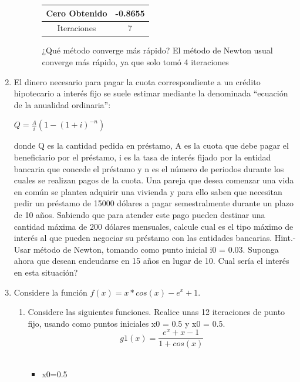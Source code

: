 \documentclass{udparticle}
\begin{document}
\begin{enumerate}
\begin{enumerate}
\begin{enumerate}
\begin{table}[H]
\begin{tabular} { |c|c|}
        \hline
        Cero Obtenido &  -0.8655\\
        \hline
        Iteraciones   &    7\\
        \hline
        
        \end{tabular}
        \end{table}
        ¿Qué método converge más rápido?
        El método de Newton usual converge más rápido, ya que solo tomó 4 iteraciones %
    \end{enumerate}
\end{enumerate}
\newpage
\item El dinero necesario para pagar la cuota correspondiente a un crédito hipotecario a interés fijo se suele
estimar mediante la denominada “ecuación de la anualidad ordinaria”:
\begin{center}
    $ Q = \frac{A}{i}(1-(1+i)^{-n}) $
\end{center}
donde Q es la cantidad pedida en préstamo, A es la cuota que debe pagar el beneficiario por el
préstamo, i es la tasa de interés fijado por la entidad bancaria que concede el préstamo y n es el
número de periodos durante los cuales se realizan pagos de la cuota.
Una pareja que desea comenzar una vida en común se plantea adquirir una vivienda y para ello saben
que necesitan pedir un préstamo de 15000 dólares a pagar semestralmente durante un plazo de 10 años.
Sabiendo que para atender este pago pueden destinar una cantidad máxima de 200 dólares mensuales,
calcule cual es el tipo máximo de interés al que pueden negociar su préstamo con las entidades bancarias.
Hint.- Usar método de Newton, tomando como punto inicial i0 = 0.03.
Suponga ahora que desean endeudarse en 15 años en lugar de 10. Cual sería el interés en esta situación?


\item Considere la función \(f(x) = x*cos(x)-e^x+ 1\). %
\begin{enumerate}
    
\vspace{0.9cm}
\item Considere las siguientes funciones. Realice unas 12 iteraciones de punto fijo, usando como puntos iniciales x0 = 0.5 y x0 = 0.5.\\ 


\begin{equation}
 g1(x) = \frac{e^x+x-1}
{1 + cos(x)}
\end{equation}
\\
\begin{itemize}
\item x0=0.5
\end{itemize}



\end{enumerate}
\end{enumerate}
\end{document}
